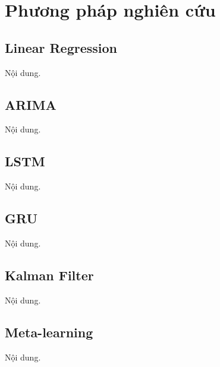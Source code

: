 \section{Phương pháp nghiên cứu}
\subsection{Linear Regression}
Nội dung.

\subsection{ARIMA}
Nội dung.

\subsection{LSTM}
Nội dung.

\subsection{GRU}
Nội dung.

\subsection{Kalman Filter}
Nội dung.

\subsection{Meta-learning}
Nội dung.